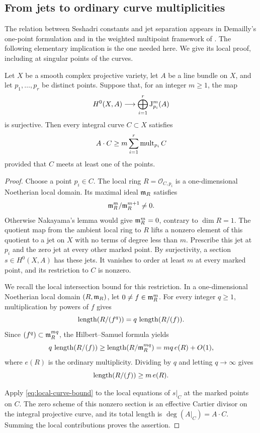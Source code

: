 \subsection{From jets to ordinary curve multiplicities}

The relation between Seshadri constants and jet separation appears in
Demailly's one-point formulation \cite[Section~6]{Demailly1992} and in the
weighted multipoint framework of \citet[Section~5]{Ito2013}. The following elementary
implication is the one needed here. We give its local proof, including at
singular points of the curves.

\begin{lemma}
\label{lem:jets-curves}
Let $X$ be a smooth complex projective variety, let $A$ be a line bundle
on $X$, and let $p_1,\ldots,p_r$ be distinct points. Suppose that, for an
integer $m\ge1$, the map
\[
 H^0(X,A)\longrightarrow\bigoplus_{i=1}^r\mathrm J_{p_i}^{m}(A)
\]
is surjective. Then every integral curve $C\subset X$ satisfies
\[
 A\cdot C\ge m\sum_{i=1}^r\operatorname{mult}_{p_i}C
\]
provided that $C$ meets at least one of the points.
\end{lemma}

\begin{proof}
Choose a point $p_i\in C$. The local ring $R=\mathcal O_{C,p_i}$ is a
one-dimensional Noetherian local domain. Its maximal ideal $\mathfrak m_R$
satisfies
\[
 \mathfrak m_R^m/\mathfrak m_R^{m+1}\ne0.
\]
Otherwise Nakayama's lemma would give $\mathfrak m_R^m=0$, contrary to
$\dim R=1$. The quotient map from the ambient local ring to $R$ lifts a
nonzero element of this quotient to a jet on $X$ with no terms of degree
less than $m$. Prescribe this jet at $p_i$ and the zero jet at every other
marked point. By surjectivity, a section $s\in H^0(X,A)$ has these jets.
It vanishes to order at least $m$ at every marked point, and its restriction
to $C$ is nonzero.

We recall the local intersection bound for this restriction. In a
one-dimensional Noetherian local domain $(R,\mathfrak m_R)$, let
$0\ne f\in\mathfrak m_R^m$. For every integer $q\ge1$, multiplication by
powers of $f$ gives
\[
 \operatorname{length}(R/(f^q))=q\,\operatorname{length}(R/(f)).
\]
Since $(f^q)\subset\mathfrak m_R^{mq}$, the Hilbert--Samuel formula yields
\[
 q\,\operatorname{length}(R/(f))
 \ge\operatorname{length}(R/\mathfrak m_R^{mq})
 =mq\,e(R)+O(1),
\]
where $e(R)$ is the ordinary multiplicity. Dividing by $q$ and letting
$q\to\infty$ gives
\begin{equation}
 \label{eq:local-curve-bound}
 \operatorname{length}(R/(f))\ge m\,e(R).
\end{equation}

Apply \eqref{eq:local-curve-bound} to the local equations of $s|_C$ at
the marked points on $C$. The zero scheme of this nonzero section is an
effective Cartier divisor on the integral projective curve, and its total
length is $\deg(A|_C)=A\cdot C$. Summing the local contributions proves
the assertion.
\end{proof}

